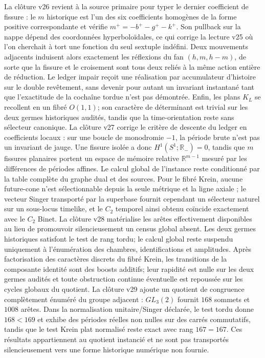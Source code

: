\documentclass[11pt,a4paper]{article}
\begin{document}
La clôture v26 revient à la source primaire pour typer le dernier coefficient de fissure : le $m$ historique est l'un des six coefficients homogènes de la forme positive correspondante et vérifie $m^+=-b^+-g^+-k^+$. Son pullback sur la nappe dépend des coordonnées hyperboloïdales, ce qui corrige la lecture v25 où l'on cherchait à tort une fonction du seul sextuple indéfini. Deux mouvements adjacents induisent alors exactement les réflexions du fan $(h,m,h-m)$, de sorte que la fissure et le croisement sont tous deux reliés à la même action entière de réduction. Le ledger impair reçoit une réalisation par accumulateur d'histoire sur le double revêtement, sans devenir pour autant un invariant instantané tant que l'exactitude de la cochaîne tordue n'est pas démontrée. Enfin, les plans $K_L$ se recollent en un fibré $O(1,1)$; son caractère de déterminant est trivial sur les deux germes historiques audités, tandis que la time-orientation reste sans sélecteur canonique.
La clôture v27 corrige le critère de descente du ledger en coefficients locaux : sur une boucle de monodromie $-1$, la période brute n'est pas un invariant de jauge. Une fissure isolée a donc $H^1(S^1;\mathbb R_-)=0$, tandis que $m$ fissures planaires portent un espace de mémoire relative $\mathbb R^{m-1}$ mesuré par les différences de périodes affines. Le calcul global de l'instance reste conditionné par la table complète du graphe dual et des sources. Pour le fibré Krein, aucune future-cone n'est sélectionnable depuis la seule métrique et la ligne axiale ; le vecteur Singer transporté par la superbase fournit cependant un sélecteur naturel sur un sous-locus timelike, et le $C_2$ temporel ainsi obtenu coïncide exactement avec le $C_2$ Binet.
La clôture v28 matérialise les arêtes effectivement disponibles au lieu de promouvoir silencieusement un census global absent. Les deux germes historiques satisfont le test de rang tordu; le calcul global reste suspendu uniquement à l’énumération des chambres, identifications et amplitudes. Après factorisation des caractères discrets du fibré Krein, les transitions de la composante identité sont des boosts additifs; leur rapidité est nulle sur les deux germes audités et toute obstruction continue éventuelle est repoussée sur les cycles globaux du quotient.
La clôture v29 ajoute un quotient de congruence complètement énuméré du groupe adjacent : $GL_3(2)$ fournit $168$ sommets et $1008$ arêtes. Dans la normalisation unitaire/Singer déclarée, le test tordu donne $168<169$ et exhibe des périodes réelles non nulles sur des carrés commutatifs, tandis que le test Krein plat normalisé reste exact avec rang $167=167$. Ces résultats appartiennent au quotient instancié et ne sont pas transportés silencieusement vers une forme historique numérique non fournie.
\end{document}
